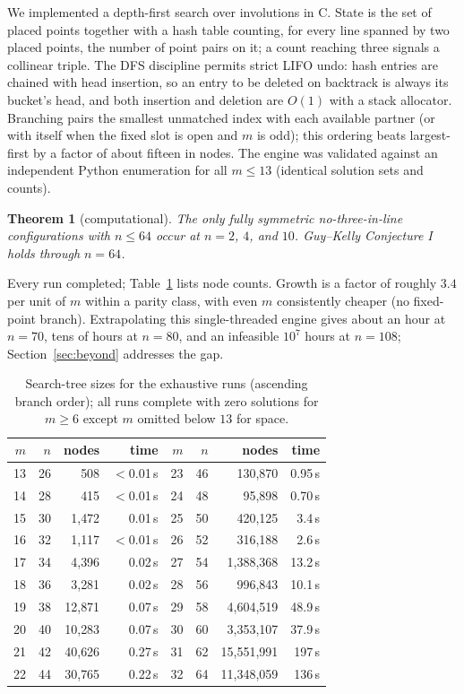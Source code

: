 \documentclass[11pt]{article}
\newtheorem{theorem}{Theorem}
\theoremstyle{remark}
\begin{document}
We implemented a depth-first search over involutions in C.
State is the set of placed points together with a hash table counting,
for every line spanned by two placed points,
the number of point pairs on it;
a count reaching three signals a collinear triple.
The DFS discipline permits strict LIFO undo:
hash entries are chained with head insertion,
so an entry to be deleted on backtrack is always its bucket's head,
and both insertion and deletion are $O(1)$ with a stack allocator.
Branching pairs the smallest unmatched index with each available partner
(or with itself when the fixed slot is open and $m$ is odd);
this ordering beats largest-first by a factor of about fifteen in nodes.
The engine was validated against an independent Python enumeration for all
$m\le 13$ (identical solution sets and counts).

\begin{theorem}[computational]\label{thm:64}
The only fully symmetric no-three-in-line configurations with $n\le 64$
occur at $n=2$, $4$, and $10$.
Guy--Kelly Conjecture I holds through $n=64$.
\end{theorem}

Every run completed;
Table~\ref{tab:nodes} lists node counts.
Growth is a factor of roughly $3.4$ per unit of $m$ within a parity class,
with even $m$ consistently cheaper
(no fixed-point branch).
Extrapolating this single-threaded engine gives about an hour at $n=70$,
tens of hours at $n=80$,
and an infeasible $10^{7}$ hours at $n=108$;
Section~\ref{sec:beyond} addresses the gap.

\begin{table}[t]
\centering
\caption{Search-tree sizes for the exhaustive runs (ascending branch order);
all runs complete with zero solutions for $m\ge 6$ except $m$ omitted below
$13$ for space.}
\label{tab:nodes}
\begin{tabular}{rrrr@{\qquad}rrrr}
\toprule
$m$ & $n$ & nodes & time & $m$ & $n$ & nodes & time\\
\midrule
13 & 26 &        508 & $<$0.01\,s & 23 & 46 &    130{,}870 & 0.95\,s\\
14 & 28 &        415 & $<$0.01\,s & 24 & 48 &     95{,}898 & 0.70\,s\\
15 & 30 &      1{,}472 & 0.01\,s  & 25 & 50 &    420{,}125 & 3.4\,s\\
16 & 32 &      1{,}117 & $<$0.01\,s & 26 & 52 &  316{,}188 & 2.6\,s\\
17 & 34 &      4{,}396 & 0.02\,s  & 27 & 54 &  1{,}388{,}368 & 13.2\,s\\
18 & 36 &      3{,}281 & 0.02\,s  & 28 & 56 &    996{,}843 & 10.1\,s\\
19 & 38 &     12{,}871 & 0.07\,s  & 29 & 58 &  4{,}604{,}519 & 48.9\,s\\
20 & 40 &     10{,}283 & 0.07\,s  & 30 & 60 &  3{,}353{,}107 & 37.9\,s\\
21 & 42 &     40{,}626 & 0.27\,s  & 31 & 62 & 15{,}551{,}991 & 197\,s\\
22 & 44 &     30{,}765 & 0.22\,s  & 32 & 64 & 11{,}348{,}059 & 136\,s\\
\bottomrule
\end{tabular}
\end{table}
\end{document}
